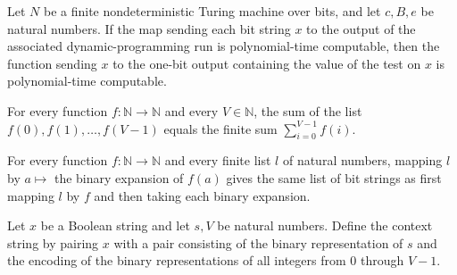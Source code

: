 \begin{theorem}
\label{Randomized.BPLInP.polyTimeComputable_bplTest_of_run}
\leanok
{}
Let $N$ be a finite nondeterministic Turing machine over bits, and let $c,B,e$ be
natural numbers. If the map sending each bit string $x$ to the output of the associated
dynamic-programming run is polynomial-time computable, then the function sending $x$ to
the one-bit output containing the value of the test on $x$ is polynomial-time
computable.
\end{theorem}

\begin{theorem}
\label{Randomized.BPLInP.sum_map_range}
\leanok
{}
For every function $f:\mathbb{N}\to\mathbb{N}$ and every $V\in\mathbb{N}$, the sum of
the list $f(0),f(1),\ldots,f(V-1)$ equals the finite sum $\sum_{i=0}^{V-1}f(i)$.
\end{theorem}

\begin{theorem}
\label{Randomized.BPLInP.map_bits}
\leanok
{}
For every function $f:\mathbb{N}\to\mathbb{N}$ and every finite list $l$ of natural
numbers, mapping $l$ by $a\mapsto$ the binary expansion of $f(a)$ gives the same list of
bit strings as first mapping $l$ by $f$ and then taking each binary expansion.
\end{theorem}

\begin{definition}
\label{Randomized.BPLInP.ctxOf}
\leanok
{}
Let $x$ be a Boolean string and let $s,V$ be natural numbers. Define the context string
by pairing $x$ with a pair consisting of the binary representation of $s$ and the
encoding of the binary representations of all integers from $0$ through $V-1$.
\end{definition}

